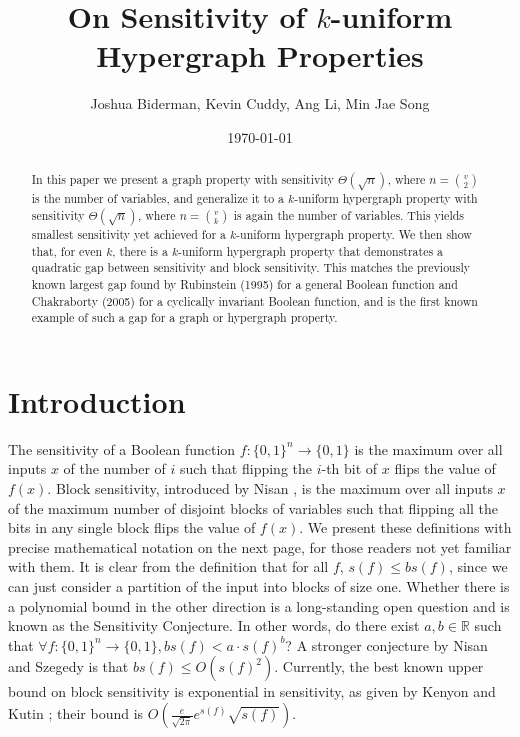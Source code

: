 \documentclass[psamsfonts]{amsart}
\theoremstyle{definition}
\theoremstyle{remark}
\numberwithin{equation}{section}
\begin{document}
	\title{On Sensitivity of $k$-uniform Hypergraph Properties}

	\author{Joshua Biderman, Kevin Cuddy, Ang Li, Min Jae Song}
	\date{\today}
	\begin{abstract}
		 In this paper we present a graph property with sensitivity $\Theta(\sqrt{n})$, where $n={v\choose2}$ is the number of variables, and generalize it to a $k$-uniform hypergraph property with sensitivity $\Theta(\sqrt{n})$, where $n={v\choose k}$ is again the number of variables. This yields smallest sensitivity yet achieved for a $k$-uniform hypergraph property. We then show that, for even $k$, there is a $k$-uniform hypergraph property that demonstrates a quadratic gap between sensitivity and block sensitivity. This matches the previously known largest gap found by Rubinstein (1995) for a general Boolean function and Chakraborty (2005) for a cyclically invariant Boolean function, and is the first known example of such a gap for a graph or hypergraph property.
	\end{abstract}
	\maketitle
	
	\tableofcontents
	
	\section{Introduction}
The sensitivity of a Boolean function $f: \{0,1\}^{n} \rightarrow \{0,1\}$ is the maximum over all inputs $x$ of the number of $i$ such that flipping the $i$-th bit of $x$ flips the value of $f(x)$. Block sensitivity, introduced by Nisan \cite{N}, is the maximum over all inputs $x$ of the maximum number of disjoint blocks of variables such that flipping all the bits in any single block flips the value of $f(x)$. We present these definitions with precise mathematical notation on the next page, for those readers not yet familiar with them.  It is clear from the definition that for all $f$, $s(f) \leq bs(f)$, since we can just consider a partition of the input into blocks of size one.  Whether there is a polynomial bound in the other direction is a long-standing open question and is known as the Sensitivity Conjecture. In other words, do there exist $a,b\in\mathbb{R}$ such that $\forall f:\{0,1\}^n\to\{0,1\},  bs(f)<a\cdot s(f)^b$? A stronger conjecture by Nisan and Szegedy \cite{NS} is that $bs(f) \leq O(s(f)^{2})$. Currently, the best known upper bound on block sensitivity is exponential in sensitivity, as given by Kenyon and Kutin \cite{KK}; their bound is $O(\frac{e}{\sqrt{2\pi}}e^{s(f)}\sqrt{s(f)})$.
\end{document}
